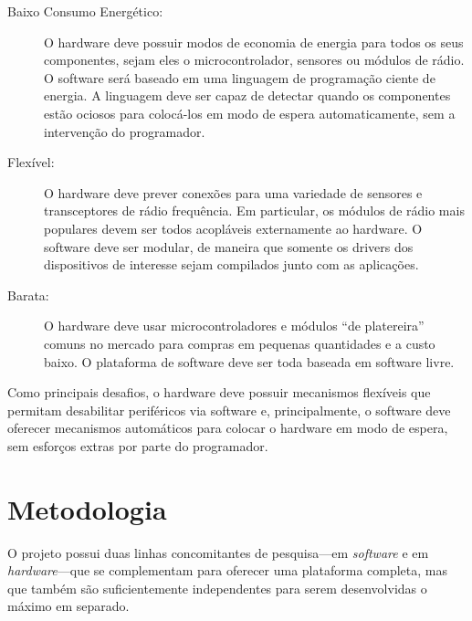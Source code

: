 \documentclass[titlepage,12pt]{article}
\begin{document}
\begin{description}
%
\item[Baixo Consumo Energético:]
  O hardware deve possuir modos de economia de energia para todos os seus
  componentes, sejam eles o microcontrolador, sensores ou módulos de rádio.
  O software será baseado em uma linguagem de programação ciente de energia.
  A linguagem deve ser capaz de detectar quando os componentes estão ociosos
  para colocá-los em modo de espera automaticamente, sem a intervenção do
  programador.
%
\item[Flexível:]
  O hardware deve prever conexões para uma variedade de sensores e
  transceptores de rádio frequência.
  Em particular, os módulos de rádio mais populares devem ser todos acopláveis
  externamente ao hardware.
  O software deve ser modular, de maneira que somente os drivers dos
  dispositivos de interesse sejam compilados junto com as aplicações.
%
\item[Barata:]
  O hardware deve usar microcontroladores e módulos ``de platereira'' comuns no
  mercado para compras em pequenas quantidades e a custo baixo.
  O plataforma de software deve ser toda baseada em software livre.
%
\end{description}

Como principais desafios, o hardware deve possuir mecanismos flexíveis que
permitam desabilitar periféricos via software e, principalmente, o software
deve oferecer mecanismos automáticos para colocar o hardware em modo de espera,
sem esforços extras por parte do programador.

\section{Metodologia}

O projeto possui duas linhas concomitantes de pesquisa---em \emph{software} e
em \emph{hardware}---que se complementam para oferecer uma plataforma completa,
mas que também são suficientemente independentes para serem desenvolvidas o
máximo em separado.
\end{document}
